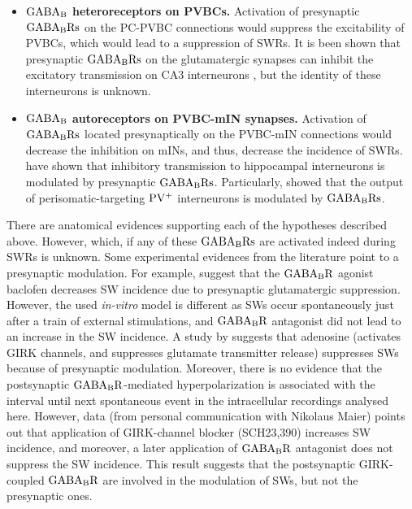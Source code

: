 \begin{itemize}
      \item \textbf{$\rm GABA_B$ heteroreceptors on PVBCs.}
        Activation of presynaptic $\rm GABA_BRs$ on the PC-PVBC connections
        would suppress the excitability of PVBCs, which would lead to a
        suppression of SWRs. It is been shown that presynaptic $\rm GABA_BRs$
        on the glutamatergic synapses can inhibit the excitatory transmission
        on CA3 interneurons \citep{Lei2003}, but the identity of these
        interneurons is unknown.

      \item \textbf{$\rm GABA_B$ autoreceptors on PVBC-mIN synapses.}
        Activation of $\rm GABA_BRs$ located presynaptically on the PVBC-mIN
        connections would decrease the inhibition on mINs, and thus, decrease
        the incidence of SWRs. \cite{Lei2003} have shown that inhibitory
        transmission to hippocampal interneurons is modulated by presynaptic
        $\rm GABA_BRs$. Particularly, \cite{Booker2013} showed that the output
        of perisomatic-targeting $\rm PV^+$ interneurons is modulated by $\rm
        GABA_BRs$.
    \end{itemize}

    There are anatomical evidences supporting each of the hypotheses described
    above. However, which, if any of these $\rm GABA_BRs$ are activated indeed
    during SWRs is unknown. Some experimental evidences from the literature
    point to a presynaptic modulation. For example, \cite{Hollnagel2014}
    suggest that the $\rm GABA_BR$ agonist baclofen decreases SW incidence due
    to presynaptic glutamatergic suppression.  However, the used
    \textit{in-vitro} model is different as SWs occur spontaneously just after
    a train of external stimulations, and $\rm GABA_BR$ antagonist did not lead
    to an increase in the SW incidence. A study by \cite{Maier2012} suggests
    that adenosine (activates GIRK channels, and suppresses glutamate
    transmitter release) suppresses SWs because of presynaptic modulation.
    Moreover, there is no evidence that the postsynaptic $\rm GABA_BR$-mediated
    hyperpolarization is associated with the interval until next spontaneous
    event in the intracellular recordings analysed here. However, data (from
    personal communication with Nikolaus Maier) points out that application of
    GIRK-channel blocker (SCH23,390) increases SW incidence, and moreover, a
    later application of $\rm GABA_BR$ antagonist does not suppress the SW
    incidence. This result suggests that the postsynaptic GIRK-coupled $\rm
    GABA_BR$ are involved in the modulation of SWs, but not the presynaptic
    ones. 
    
